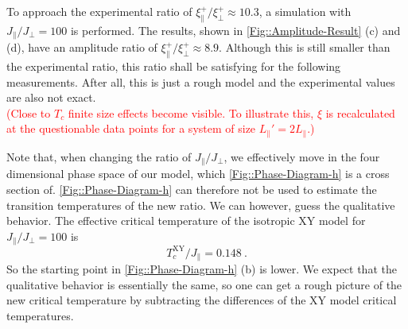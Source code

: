 	To approach the experimental ratio of $\xi_\parallel^+ /	\xi_\perp^+ \approx 10.3$, a simulation with $J_\parallel /	J_\perp =	100$ is performed. The results, shown in \autoref{Fig::Amplitude-Result} (c) and (d), have an amplitude ratio of $\xi_{\parallel}^+ /	\xi_\perp^+  \approx  8.9$. Although this is still smaller than the experimental ratio, this ratio shall be satisfying for the following measurements. After all, this is just a rough model and the experimental values are also not exact. \\
	
	\textcolor{red}{(Close to $T_c$ finite size effects become visible. To illustrate this, $\xi$ is recalculated at the questionable data points for a system of size $L_\parallel' =	2 L_\parallel$.)}
	
	Note that, when changing the ratio of $J_\parallel /	J_\perp$, we effectively move in the four dimensional phase space of our model, which \autoref{Fig::Phase-Diagram-h} is a cross section of. \autoref{Fig::Phase-Diagram-h} can therefore not be used to estimate the transition temperatures of the new ratio. We can however, guess the qualitative behavior. The effective critical temperature of the isotropic XY model for $J_\parallel /	J_\perp = 100$ is
	\begin{equation}
		T_c^{\text{XY}} /	J_\parallel =	0.148~.
	\end{equation}
	So the starting point in \autoref{Fig::Phase-Diagram-h} (b) is lower. We expect that the qualitative behavior is essentially the same, so one can get a rough picture of the new critical temperature by subtracting the differences of the XY model critical temperatures.
	
